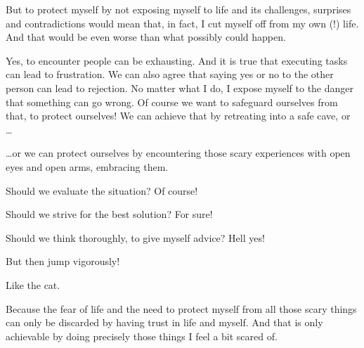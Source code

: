 But to protect myself by not exposing myself to life and its challenges, surprises and contradictions would mean that, in fact,  I cut myself off from my own (!) life. And that would be even worse than what possibly could happen.

Yes, to encounter people can be exhausting. And it is true that executing tasks can lead to frustration. We can also agree that saying yes or no to the other person can lead to rejection. No matter what I do, I expose myself to the danger that something can go wrong. Of course we want to safeguard ourselves from that, to protect ourselves! We can achieve that by retreating into a safe cave, or \ldots

\ldots or we can protect ourselves by encountering those scary experiences with open eyes and open arms, embracing them.

Should we evaluate the situation? Of course!

Should we strive for the best solution? For sure!

Should we think thoroughly, to give myself advice? Hell yes!

But then jump vigorously!

Like the cat.

Because the fear of life and the need to protect myself from all those scary things can only be discarded by having trust in life and myself. And that is only achievable by doing precisely those things I feel a bit scared of.
